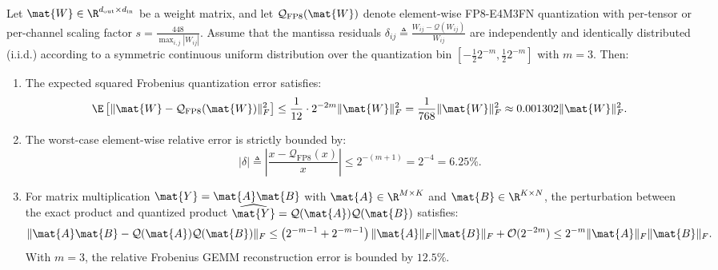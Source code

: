 \begin{theorem}
\label{thm:fp8_mantissa_bounds}
Let $\mat{W} \in \R^{d_{\text{out}} \times d_{\text{in}}}$ be a weight matrix, and let $\mathcal{Q}_{\text{FP8}}(\mat{W})$ denote element-wise FP8-E4M3FN quantization with per-tensor or per-channel scaling factor $s = \frac{448}{\max_{i,j} |W_{ij}|}$. Assume that the mantissa residuals $\delta_{ij} \triangleq \frac{W_{ij} - \mathcal{Q}(W_{ij})}{W_{ij}}$ are independently and identically distributed (i.i.d.) according to a symmetric continuous uniform distribution over the quantization bin $[-\frac{1}{2} 2^{-m}, \frac{1}{2} 2^{-m}]$ with $m=3$. Then:
\begin{enumerate}
    \item The expected squared Frobenius quantization error satisfies:
    \begin{equation}
    \E\left[ \| \mat{W} - \mathcal{Q}_{\text{FP8}}(\mat{W}) \|_F^2 \right] \le \frac{1}{12} \cdot 2^{-2m} \| \mat{W} \|_F^2 = \frac{1}{768} \| \mat{W} \|_F^2 \approx 0.001302 \| \mat{W} \|_F^2.
    \label{eq:fp8_global_frobenius_bound}
    \end{equation}
    \item The worst-case element-wise relative error is strictly bounded by:
    \begin{equation}
    |\delta| \triangleq \left| \frac{x - \mathcal{Q}_{\text{FP8}}(x)}{x} \right| \le 2^{-(m+1)} = 2^{-4} = 6.25\%.
    \label{eq:thm3_relative_bound}
    \end{equation}
    \item For matrix multiplication $\mat{Y} = \mat{A} \mat{B}$ with $\mat{A} \in \R^{M \times K}$ and $\mat{B} \in \R^{K \times N}$, the perturbation between the exact product and quantized product $\widehat{\mat{Y}} = \mathcal{Q}(\mat{A}) \mathcal{Q}(\mat{B})$ satisfies:
    \begin{equation}
    \| \mat{A} \mat{B} - \mathcal{Q}(\mat{A}) \mathcal{Q}(\mat{B}) \|_F \le \left( 2^{-m-1} + 2^{-m-1} \right) \| \mat{A} \|_F \| \mat{B} \|_F + \mathcal{O}(2^{-2m}) \le 2^{-m} \| \mat{A} \|_F \| \mat{B} \|_F.
    \label{eq:thm3_gemm_perturbation}
    \end{equation}
    With $m=3$, the relative Frobenius GEMM reconstruction error is bounded by $12.5\%$.
\end{enumerate}
\end{theorem}

